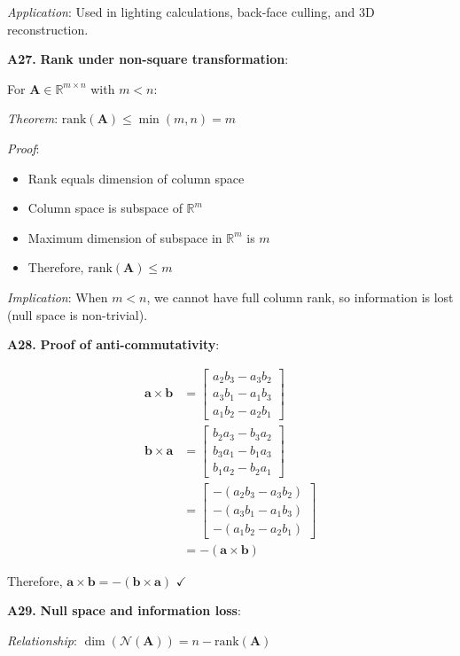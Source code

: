 \documentclass[12pt,a4paper]{article}
\theoremstyle{definition}
\begin{document}
\textit{Application}: Used in lighting calculations, back-face culling, and 3D reconstruction.

\textbf{A27.} \textbf{Rank under non-square transformation}:

For $\mathbf{A} \in \mathbb{R}^{m \times n}$ with $m < n$:

\textit{Theorem}: $\text{rank}(\mathbf{A}) \leq \min(m, n) = m$

\textit{Proof}: 
\begin{itemize}
\item Rank equals dimension of column space
\item Column space is subspace of $\mathbb{R}^m$
\item Maximum dimension of subspace in $\mathbb{R}^m$ is $m$
\item Therefore, $\text{rank}(\mathbf{A}) \leq m$
\end{itemize}

\textit{Implication}: When $m < n$, we cannot have full column rank, so information is lost (null space is non-trivial).

\textbf{A28.} \textbf{Proof of anti-commutativity}:

\begin{align}
\mathbf{a} \times \mathbf{b} &= \begin{bmatrix}
a_2b_3 - a_3b_2 \\
a_3b_1 - a_1b_3 \\
a_1b_2 - a_2b_1
\end{bmatrix} \\
\mathbf{b} \times \mathbf{a} &= \begin{bmatrix}
b_2a_3 - b_3a_2 \\
b_3a_1 - b_1a_3 \\
b_1a_2 - b_2a_1
\end{bmatrix} \\
&= \begin{bmatrix}
-(a_2b_3 - a_3b_2) \\
-(a_3b_1 - a_1b_3) \\
-(a_1b_2 - a_2b_1)
\end{bmatrix} \\
&= -(\mathbf{a} \times \mathbf{b})
\end{align}

Therefore, $\mathbf{a} \times \mathbf{b} = -(\mathbf{b} \times \mathbf{a})$ $\checkmark$

\textbf{A29.} \textbf{Null space and information loss}:

\textit{Relationship}: $\dim(\mathcal{N}(\mathbf{A})) = n - \text{rank}(\mathbf{A})$
\end{document}
